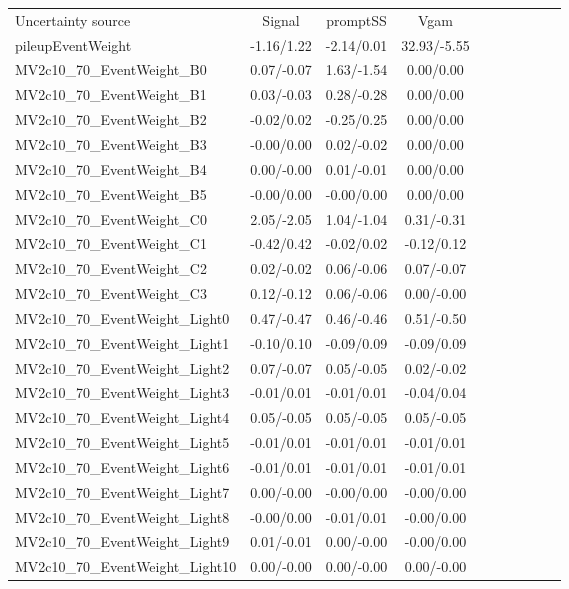 \begin{table}[h]
\scriptsize
\begin{center}
\begin{tabular}{l|ccccccccc}
\hline
\hline
Uncertainty source &Signal &promptSS &Vgam \\
pileupEventWeight &-1.16/1.22 &-2.14/0.01 &32.93/-5.55 \\
MV2c10\_70\_EventWeight\_B0 &0.07/-0.07 &1.63/-1.54 &0.00/0.00 \\
MV2c10\_70\_EventWeight\_B1 &0.03/-0.03 &0.28/-0.28 &0.00/0.00 \\
MV2c10\_70\_EventWeight\_B2 &-0.02/0.02 &-0.25/0.25 &0.00/0.00 \\
MV2c10\_70\_EventWeight\_B3 &-0.00/0.00 &0.02/-0.02 &0.00/0.00 \\
MV2c10\_70\_EventWeight\_B4 &0.00/-0.00 &0.01/-0.01 &0.00/0.00 \\
MV2c10\_70\_EventWeight\_B5 &-0.00/0.00 &-0.00/0.00 &0.00/0.00 \\
MV2c10\_70\_EventWeight\_C0 &2.05/-2.05 &1.04/-1.04 &0.31/-0.31 \\
MV2c10\_70\_EventWeight\_C1 &-0.42/0.42 &-0.02/0.02 &-0.12/0.12 \\
MV2c10\_70\_EventWeight\_C2 &0.02/-0.02 &0.06/-0.06 &0.07/-0.07 \\
MV2c10\_70\_EventWeight\_C3 &0.12/-0.12 &0.06/-0.06 &0.00/-0.00 \\
MV2c10\_70\_EventWeight\_Light0 &0.47/-0.47 &0.46/-0.46 &0.51/-0.50 \\
MV2c10\_70\_EventWeight\_Light1 &-0.10/0.10 &-0.09/0.09 &-0.09/0.09 \\
MV2c10\_70\_EventWeight\_Light2 &0.07/-0.07 &0.05/-0.05 &0.02/-0.02 \\
MV2c10\_70\_EventWeight\_Light3 &-0.01/0.01 &-0.01/0.01 &-0.04/0.04 \\
MV2c10\_70\_EventWeight\_Light4 &0.05/-0.05 &0.05/-0.05 &0.05/-0.05 \\
MV2c10\_70\_EventWeight\_Light5 &-0.01/0.01 &-0.01/0.01 &-0.01/0.01 \\
MV2c10\_70\_EventWeight\_Light6 &-0.01/0.01 &-0.01/0.01 &-0.01/0.01 \\
MV2c10\_70\_EventWeight\_Light7 &0.00/-0.00 &-0.00/0.00 &-0.00/0.00 \\
MV2c10\_70\_EventWeight\_Light8 &-0.00/0.00 &-0.01/0.01 &-0.00/0.00 \\
MV2c10\_70\_EventWeight\_Light9 &0.01/-0.01 &0.00/-0.00 &-0.00/0.00 \\
MV2c10\_70\_EventWeight\_Light10 &0.00/-0.00 &0.00/-0.00 &0.00/-0.00 \\

\end{tabular}
\end{center}
\end{table}
